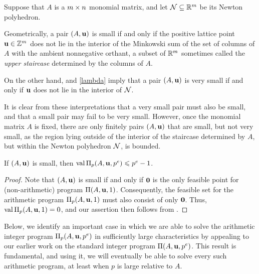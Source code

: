 \documentclass[11pt]{amsart}
\begin{document}
\begin{remark}
\label{finitely many small but not very small: R}
Suppose that $A$ is a $m \times n$ monomial matrix, and let $\mathcal{N} \subseteq \mathbb{R}^{m}$ be its Newton polyhedron.

Geometrically, a pair $(A, \mathbf{u})$ is small if and only if the positive lattice point $\mathbf{u} \in \mathbb{Z}^{m}$ does not lie in the interior of the Minkowski sum of the set of columns of $A$ with the ambient nonnegative orthant, a subset of $\mathbb{R}^{m}$ sometimes called the \emph{upper staircase} determined by the columns of $A$. 

On the other hand,  and \eqref{lambda} imply that a pair $(A, \mathbf{u})$ is very small if and only if $\mathbf{u}$ does not lie in the interior of $\mathcal{N}$.

It is clear from these interpretations that a very small pair must also be small, and that a small pair may fail to be very small.  However, once the monomial matrix $A$ is fixed, there are only finitely pairs $(A, \mathbf{u})$ that are small, but not very small, as the region lying outside of the interior of the staircase determined by $A$, but within the Newton polyhedron $\mathcal{N}$, is bounded.%
\end{remark}


\begin{proposition}
   \label{trivial value bound: P}
   If $(A, \mathbf{u})$ is small,  then $\operatorname{val} \Pi_p(A, \mathbf{u}, p^e) \leqslant p^e-1$.
\end{proposition}

\begin{proof}
   Note that $(A, \mathbf{u})$ is small if and only if $\mathbf{0}$ is the only feasible point for (non-arithmetic) program $\Pi(A, \mathbf{u}, 1)$.
   Consequently, the feasible set for the arithmetic program $\Pi_p(A, \mathbf{u}, 1)$ must also consist of only $\mathbf{0}$.  Thus, $\operatorname{val} \Pi_p(A, \mathbf{u}, 1) = 0$, and our assertion then follows from .
\end{proof}


Below, we identify an important case in which we are able to solve the arithmetic integer program $\Pi_p(A, \mathbf{u}, p^e)$ in sufficiently large characteristics by appealing to our earlier work on the standard integer program $\Pi(A, \mathbf{u}, p^e)$.  This result is fundamental, and using it, we will eventually be able to solve every such arithmetic program, at least when $p$ is large relative to $A$.
\end{document}
